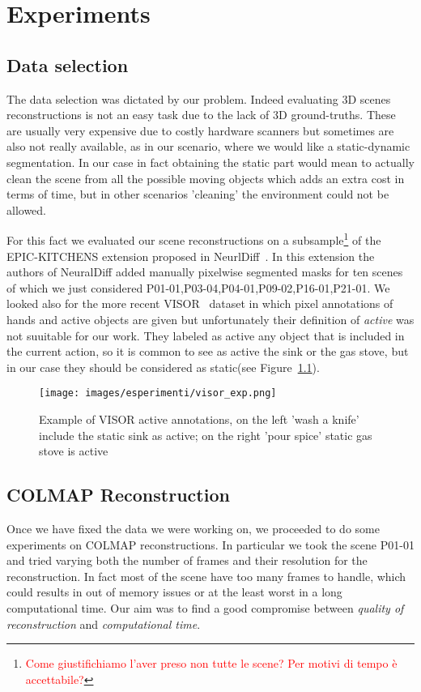 \chapter{Experiments}
\section{Data selection}
The data selection was dictated by our problem. Indeed evaluating 3D scenes 
reconstructions is not an easy task due to the lack of 3D ground-truths. These
are usually very expensive due to costly hardware scanners but sometimes are 
also not really available, as in our scenario, where we would like a static-dynamic
segmentation. In our case in fact obtaining the static part would mean to 
actually clean the scene from all the possible moving objects which adds 
an extra cost in terms of time, but in other scenarios 'cleaning' the environment
could not be allowed.

For this fact we evaluated our scene reconstructions on a subsample\footnote{\textcolor{red}{Come giustifichiamo l'aver preso non tutte le scene? Per motivi di tempo è accettabile?}}
of the EPIC-KITCHENS extension proposed in NeurlDiff~\cite{neuraldiff}. In this extension
the authors of NeuralDiff added manually pixelwise segmented masks for ten scenes of which we just considered 
P01-01,P03-04,P04-01,P09-02,P16-01,P21-01. We looked also for 
the more recent VISOR~\cite{visor} dataset in which pixel annotations of hands 
and active objects are given but unfortunately their definition of \textit{active}
was not suuitable for our work. They labeled as active any object that is 
included in the current action, so it is common to see as active the sink or 
the gas stove, but in our case they should be considered as static(see Figure~\ref{fig:vis_exp}).

\begin{figure}[H]
    \centering
    \texttt{[image: images/esperimenti/visor\_exp.png]} 
    \caption{Example of VISOR active annotations, on the left 'wash a knife' include the
    static sink as active; on the right 'pour spice' static gas stove is active}\label{fig:vis_exp}
\end{figure}


\section{COLMAP Reconstruction}
Once we have fixed the data we were working on, we proceeded to do some experiments
on COLMAP reconstructions. In particular we took the scene P01-01 and tried varying 
both the number of frames and their resolution for the reconstruction. In fact most
of the scene have too many frames to handle, which could results in out of memory issues
or at the least worst in a long computational time. Our aim was to find a good compromise
between \textit{quality of reconstruction} and \textit{computational time}.

